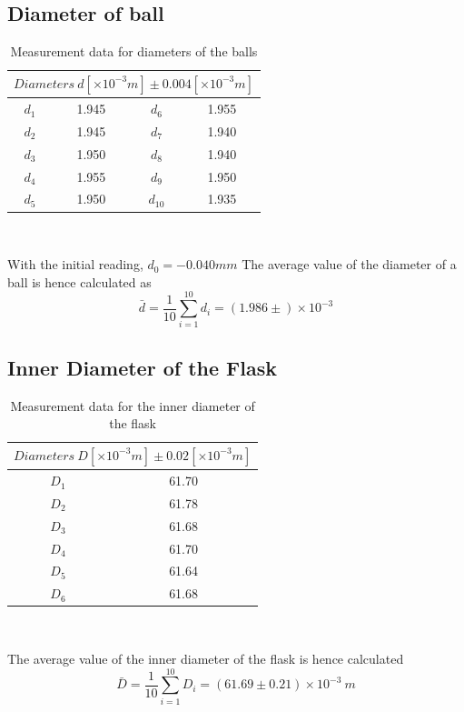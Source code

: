 \documentclass[12pt]{article}
\begin{document}
    \subsection{Diameter of ball}
        \begin{table}[htbp]
        \centering
        \begin{tabular}{|c|c|c|c|}
            \hline
            \multicolumn{4}{|c|}{ $Diameters\ d[\times10^{-3}m] \pm 0.004[\times10^{-3}m]$}\\
            \hline
            $d_1$ &1.945 &$d_6$ &1.955\\
            \hline
            $d_2$ &1.945 &$d_7$ &1.940\\
            \hline
            $d_3$ &1.950 &$d_8$ &1.940\\
            \hline
            $d_4$ &1.955 &$d_9$ &1.950\\
            \hline
            $d_5$ &1.950 &$d_{10}$ &1.935\\         
            \hline
        \end{tabular}\\
        \caption{Measurement data for diameters of the balls}
        \label{balldiameter}
    \end{table}     
    With the initial reading, $d_0 = -0.040 mm$
    The average value of the diameter of a ball is hence calculated as
    \[
        \bar{d}=\frac{1}{10}\sum_{i=1}^{10}d_i=(1.986\pm )\times10^{-3}
    \]
    \subsection{Inner Diameter of the Flask}
    \begin{table}[htbp]
        \centering
        \begin{tabular}{|c|c|}
            \hline
            \multicolumn{2}{|c|}{$Diameters\ D[\times10^{-3}m] \pm 0.02[\times10^{-3}m]$}\\
            \hline
            $D_1$ & 61.70\\
            \hline
            $D_2$ & 61.78\\
            \hline
            $D_3$ & 61.68\\
            \hline
            $D_4$ & 61.70\\
            \hline
            $D_5$ & 61.64\\
            \hline
            $D_6$ & 61.68\\ 
            \hline          
        \end{tabular}\\
        \caption{Measurement data for the inner diameter of the flask}
        \label{innerdiameter}
    \end{table}
    The average value of the inner diameter of the flask is hence calculated 
    \[
        \bar{D}=\frac{1}{10}\sum_{i=1}^{10}D_i=(61.69\pm0.21)\times10^{-3}\ m
    \]
\end{document}

